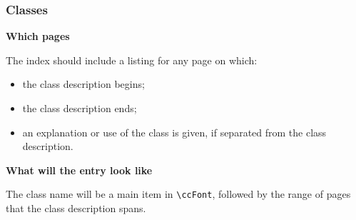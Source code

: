 \documentclass{article}
\begin{document}
\subsubsection{Classes}
\label{classes}

\begin{description}
   \item{\bf Which pages}

         The index should include a listing for any page on which:
       \begin{itemize}
           \item the class description begins;
           \item the class description ends;
           \item an explanation or use of the class is given,
                 if separated from the class description.
       \end{itemize}

   \item{\bf What will the entry look like}

       The class name will be a main item in \verb|\ccFont|, followed by
       the range of pages that the class description spans. 
                 

\end{description}
\end{document}
